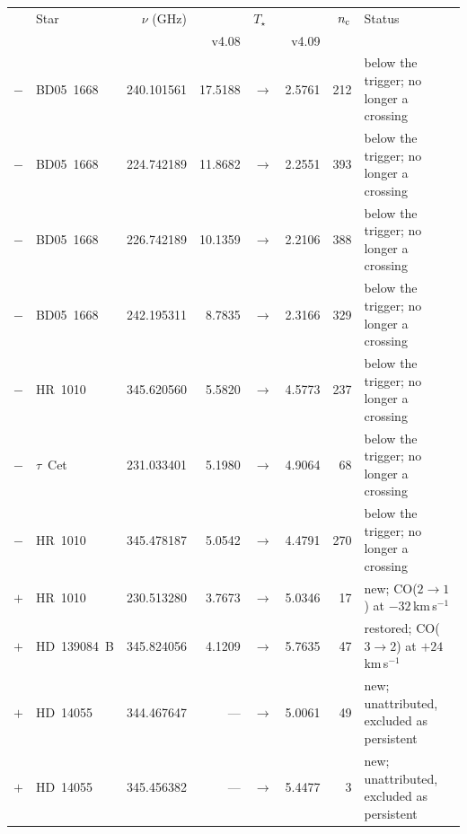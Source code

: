 \begin{tabular}{@{}l@{~}l@{~~}r@{~~}r@{~}c@{~}r@{~~}r@{~~}l@{}}
\hline
& Star & $\nu$ (GHz) & \multicolumn{3}{c}{$T_\star$} & $n_{\rm c}$ & Status \\
& & & v4.08 & & v4.09 & & \\
\hline
$-$ & BD05~1668 & 240.101561 & 17.5188 & $\to$ & 2.5761 & 212 & below the trigger; no longer a crossing \\
$-$ & BD05~1668 & 224.742189 & 11.8682 & $\to$ & 2.2551 & 393 & below the trigger; no longer a crossing \\
$-$ & BD05~1668 & 226.742189 & 10.1359 & $\to$ & 2.2106 & 388 & below the trigger; no longer a crossing \\
$-$ & BD05~1668 & 242.195311 & 8.7835 & $\to$ & 2.3166 & 329 & below the trigger; no longer a crossing \\
$-$ & HR~1010 & 345.620560 & 5.5820 & $\to$ & 4.5773 & 237 & below the trigger; no longer a crossing \\
$-$ & $\tau$~Cet & 231.033401 & 5.1980 & $\to$ & 4.9064 & 68 & below the trigger; no longer a crossing \\
$-$ & HR~1010 & 345.478187 & 5.0542 & $\to$ & 4.4791 & 270 & below the trigger; no longer a crossing \\
$+$ & HR~1010 & 230.513280 & 3.7673 & $\to$ & 5.0346 & 17 & new; CO($2{\to}1$) at $-32$\,km\,s$^{-1}$ \\
$+$ & HD~139084~B & 345.824056 & 4.1209 & $\to$ & 5.7635 & 47 & restored; CO($3{\to}2$) at $+24$\,km\,s$^{-1}$ \\
$+$ & HD~14055 & 344.467647 & --- & $\to$ & 5.0061 & 49 & new; unattributed, excluded as persistent \\
$+$ & HD~14055 & 345.456382 & --- & $\to$ & 5.4477 & 3 & new; unattributed, excluded as persistent \\
\hline
\end{tabular}
